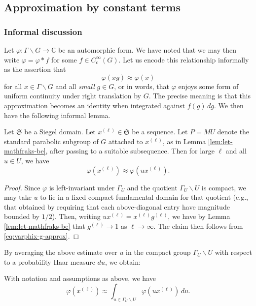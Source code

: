 \documentclass[reqno]{amsart} 
\begin{document}
\subsection{Approximation by constant terms}\label{sec:appr-const-terms}

\subsubsection{Informal discussion}\label{sec:approx-const-terms-informal-discussion}
Let $\varphi : \Gamma \backslash G \rightarrow \mathbb{C}$ be an automorphic form.  We have noted that we may then write $\varphi = \varphi \ast f$ for some $f \in C_c^\infty(G)$.  Let us encode this relationship informally as the assertion that
\begin{equation}\label{eq:varphix-g-approx}
  \varphi(x g) \approx \varphi(x)
\end{equation}
for all $x \in \Gamma \backslash G$ and all \emph{small} $g \in G$, or in words, that $\varphi$ enjoys some form of uniform continuity under right translation by $G$.  The precise meaning is that this approximation becomes an identity when integrated against $f(g) \, d g$.  We then have the following informal lemma.
\begin{lemma}
  [Informal]
  Let $\mathfrak{S}$ be a Siegel domain.  Let $x^{(\ell)} \in \mathfrak{S}$ be a sequence.  Let $P = M U$ denote the standard parabolic subgroup of $G$ attached to $x^{(\ell)}$, as in Lemma \ref{lem:let-mathfraks-be}, after passing to a suitable subsequence.  Then for large $\ell$ and all $u \in U$, we have
  \begin{equation*}
    \varphi(x^{(\ell)}) \approx \varphi(u x^{(\ell)}).
  \end{equation*}
\end{lemma}
\begin{proof}
  Since $\varphi$ is left-invariant under $\Gamma_U$ and the quotient $\Gamma_U \backslash U$ is compact, we may take $u$ to lie in a fixed compact fundamental domain for that quotient (e.g., that obtained by requiring that each above-diagonal entry have magnitude bounded by $1/2$).  Then, writing $u x^{(\ell)} = x^{(\ell)} g^{(\ell)}$, we have by Lemma \ref{lem:let-mathfraks-be} that $g^{(\ell)} \rightarrow 1$ as $\ell \rightarrow \infty$.  The claim then follows from \eqref{eq:varphix-g-approx}.
\end{proof}
By averaging the above estimate over $u$ in the compact group $\Gamma_U \backslash U$ with respect to a probability Haar measure $d u$,
we obtain:
\begin{corollary}[Informal]\label{cor:with-notat-assumpt}
  With notation and assumptions as above, we have
  \begin{equation*}
    \varphi(x^{(\ell)}) \approx \int_{u \in \Gamma_U \backslash U} \varphi(u x^{(\ell)}) \, d u.
  \end{equation*}
\end{corollary}
\end{document}
